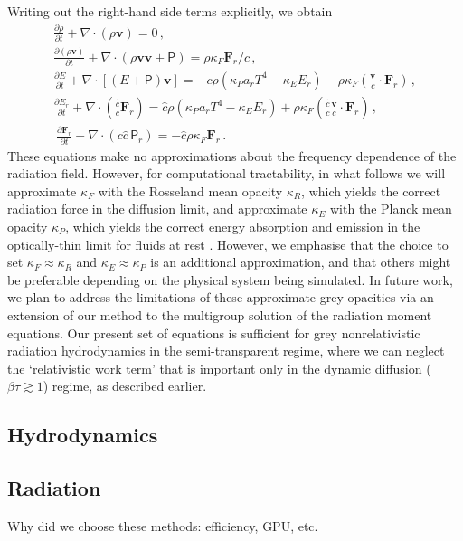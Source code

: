 \documentclass[fleqn,usenatbib]{mnras}
\newcommand{\vc}[1]{{\mathbf{#1}}}
\begin{document}
Writing out the right-hand side terms explicitly, we obtain
\begin{align}
    \frac{\partial \rho}{\partial t} + \nabla \cdot (\rho \vc{v}) = 0 \, , \\
    \frac{\partial (\rho \vc{v})}{\partial t} + \nabla \cdot (\rho \vc{v} \vc{v} + \mathsf{P}) = \rho \kappa_F {\vc{F}_r / c} \, , \\
    \frac{\partial E}{\partial t} + \nabla \cdot \left[(E + \mathsf{P})\vc{v}\right] = -c \rho (\kappa_P a_r T^4 - \kappa_E E_r) - \rho \kappa_F \left( \frac{\vc{v}}{c} \cdot \vc{F}_r \right) \, , \\
    \frac{\partial E_r}{\partial t} + \nabla \cdot \left( \frac{\hat c}{c} \vc{F}_r \right) = \hat c \rho \left(\kappa_P a_r T^4 - \kappa_E E_r \right) + \rho \kappa_F \left( \frac{\hat c}{c} \frac{\vc{v}}{c} \cdot \vc{F}_r \right) \, , \\\
    \frac{\partial \vc{F}_r}{\partial t} + \nabla \cdot (c \hat c \, \mathsf{P}_r) = -\hat c \rho \kappa_F \vc{F}_r \, .
\end{align}
These equations make no approximations about the frequency dependence of the radiation field. However, for computational tractability, in what follows we will approximate $\kappa_F$ with the Rosseland mean opacity $\kappa_R$, which yields the correct radiation force in the diffusion limit, and approximate $\kappa_E$ with the Planck mean opacity $\kappa_P$, which yields the correct energy absorption and emission in the optically-thin limit for fluids at rest \citep{Mihalas_1984}. However, we emphasise that the choice to set $\kappa_F \approx \kappa_R$ and $\kappa_E \approx \kappa_P$ is an additional approximation, and that others might be preferable depending on the physical system being simulated.  In future work, we plan to address the limitations of these approximate grey opacities via an extension of our method to the multigroup solution of the radiation moment equations.  Our present set of equations is sufficient for grey nonrelativistic radiation hydrodynamics in the semi-transparent regime, where we can neglect the `relativistic work term' that is important only in the dynamic diffusion ($\beta \tau \gtrsim 1$) regime, as described earlier.

\subsection{Hydrodynamics}

\subsection{Radiation}
Why did we choose these methods: efficiency, GPU, etc.
\end{document}
